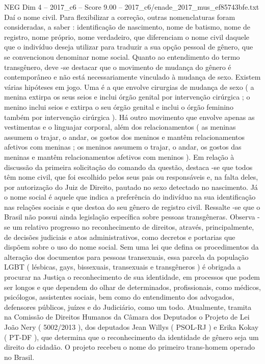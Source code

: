 \begin{textsample}{NEG Dim 4 – 2017\_c6 – Score 9.00 – 2017\_c6/enade\_2017\_mus\_ef85743bfe.txt}
Daí o nome civil.
Para flexibilizar a correção, outras nomenclaturas foram consideradas, a saber : identificação de nascimento, nome de batismo, nome de registro, nome próprio, nome verdadeiro, que diferenciam o nome civil daquele que o indivíduo deseja utilizar para traduzir a sua opção pessoal de gênero, que se convencionou denominar nome social.
Quanto ao entendimento do termo transgênero, deve -se destacar que o movimento de mudança do gênero é contemporâneo e não está necessariamente vinculado à mudança de sexo.
Existem várias hipóteses em jogo.
Uma é a que envolve cirurgias de mudança de sexo ( a menina extirpa os seus seios e inclui órgão genital por intervenção cirúrgica ; o menino inclui seios e extirpa o seu órgão genital e inclui o órgão feminino também por intervenção cirúrgica ).
Há outro movimento que envolve apenas as vestimentas e o linguajar corporal, além dos relacionamentos ( as meninas assumem o trajar, o andar, os gostos dos meninos e mantêm relacionamentos afetivos com meninas ; os meninos assumem o trajar, o andar, os gostos das meninas e mantêm relacionamentos afetivos com meninos ).
Em relação à discussão da primeira solicitação do comando da questão, destaca -se que todos têm nome civil, que foi escolhido pelos seus pais ou responsáveis e, na falta deles, por autorização do Juiz de Direito, pautado no sexo detectado no nascimento.
Já o nome social é aquele que indica a preferência do indivíduo na sua identificação nas relações sociais e que destoa do seu gênero de registro civil.
Ressalte -se que o Brasil não possui ainda legislação específica sobre pessoas transgêneras.
Observa -se um relativo progresso no reconhecimento de direitos, através, principalmente, de decisões judiciais e atos administrativos, como decretos e portarias que dispõem sobre o uso do nome social.
Sem uma lei que defina os procedimentos da alteração dos documentos para pessoas transexuais, essa parcela da população LGBT ( lésbicas, gays, bissexuais, transexuais e transgêneros ) é obrigada a procurar na Justiça o reconhecimento de sua identidade, em processos que podem ser longos e que dependem do olhar de determinados, profissionais, como médicos, psicólogos, assistentes sociais, bem como do entendimento dos advogados, defensores públicos, juízes e do Judiciário, como um todo.
Atualmente, tramita na Comissão de Direitos Humanos da Câmara dos Deputados o Projeto de Lei João Nery ( 5002/2013 ), dos deputados Jean Willys ( PSOL-RJ ) e Erika Kokay ( PT-DF ), que determina que o reconhecimento da identidade de gênero seja um direito do cidadão.
O projeto recebeu o nome do primeiro trans-homem operado no Brasil.

\end{textsample}
